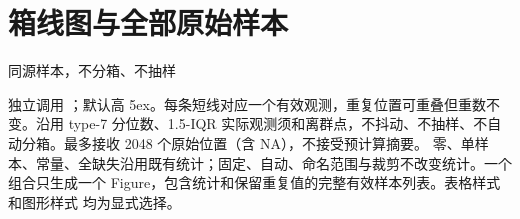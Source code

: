 \section{箱线图与全部原始样本}
\begin{example}[text and listing,sidebyside=false]{同源样本，不分箱、不抽样}
\begin{gradtable}[style=rug-report,width=\linewidth]
\end{gradtable}
\end{example}
独立调用 ；默认高 5ex。每条短线对应一个有效观测，重复位置可重叠但重数不变。沿用 type-7 分位数、1.5-IQR 实际观测须和离群点，不抖动、不抽样、不自动分箱。最多接收 2048 个原始位置（含 NA），不接受预计算摘要。
零、单样本、常量、全缺失沿用既有统计；固定、自动、命名范围与裁剪不改变统计。一个组合只生成一个 Figure，包含统计和保留重复值的完整有效样本列表。表格样式  和图形样式  均为显式选择。
